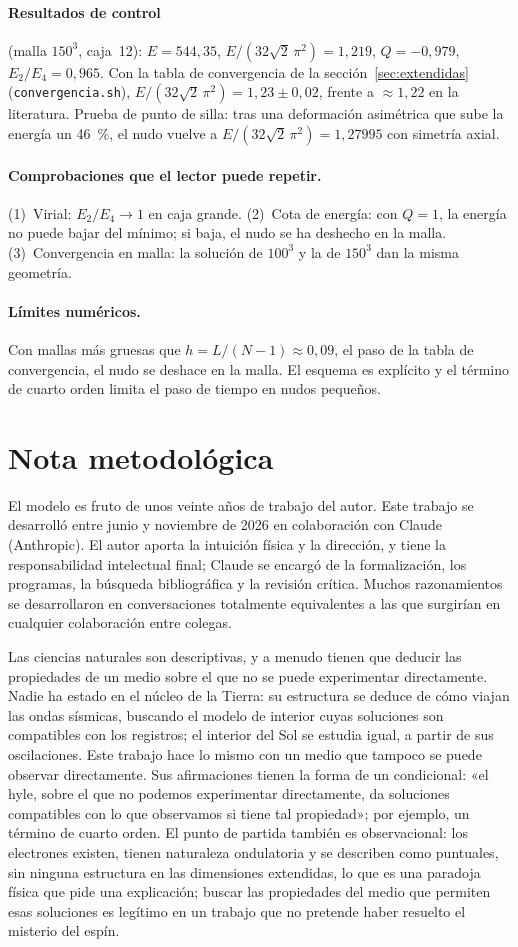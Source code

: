 \documentclass[11pt,a4paper]{article}
\newcommand{\prog}[1]{\texttt{#1}}
\newcommand{\apartado}[1]{\paragraph{#1}}
\begin{document}
\apartado{Resultados de control} (malla $150^3$, caja~12): $E=544,35$, $E/(32\sqrt2\,\pi^2)=1,219$, $Q=-0,979$, $E_2/E_4=0,965$. Con la tabla de convergencia de la sección~\ref{sec:extendidas} (\prog{convergencia.sh}), $E/(32\sqrt2\,\pi^2)=1,23\pm0,02$, frente a $\approx1,22$ en la literatura. Prueba de punto de silla: tras una deformación asimétrica que sube la energía un 46~\%, el nudo vuelve a $E/(32\sqrt2\,\pi^2)=1,27995$ con simetría axial.

\apartado{Comprobaciones que el lector puede repetir.} (1)~Virial: $E_2/E_4\to1$ en caja grande. (2)~Cota de energía: con $Q=1$, la energía no puede bajar del mínimo; si baja, el nudo se ha deshecho en la malla. (3)~Convergencia en malla: la solución de $100^3$ y la de $150^3$ dan la misma geometría.

\apartado{Límites numéricos.} Con mallas más gruesas que $h=L/(N-1)\approx0,09$, el paso de la tabla de convergencia, el nudo se deshace en la malla. El esquema es explícito y el término de cuarto orden limita el paso de tiempo en nudos pequeños.

\section*{Nota metodológica}

El modelo es fruto de unos veinte años de trabajo del autor. Este trabajo se desarrolló entre junio y noviembre de 2026 en colaboración con Claude (Anthropic). El autor aporta la intuición física y la dirección, y tiene la responsabilidad intelectual final; Claude se encargó de la formalización, los programas, la búsqueda bibliográfica y la revisión crítica. Muchos razonamientos se desarrollaron en conversaciones totalmente equivalentes a las que surgirían en cualquier colaboración entre colegas.

Las ciencias naturales son descriptivas, y a menudo tienen que deducir las propiedades de un medio sobre el que no se puede experimentar directamente. Nadie ha estado en el núcleo de la Tierra: su estructura se deduce de cómo viajan las ondas sísmicas, buscando el modelo de interior cuyas soluciones son compatibles con los registros; el interior del Sol se estudia igual, a partir de sus oscilaciones. Este trabajo hace lo mismo con un medio que tampoco se puede observar directamente. Sus afirmaciones tienen la forma de un condicional: «el hyle, sobre el que no podemos experimentar directamente, da soluciones compatibles con lo que observamos si tiene tal propiedad»; por ejemplo, un término de cuarto orden. El punto de partida también es observacional: los electrones existen, tienen naturaleza ondulatoria y se describen como puntuales, sin ninguna estructura en las dimensiones extendidas, lo que es una paradoja física que pide una explicación; buscar las propiedades del medio que permiten esas soluciones es legítimo en un trabajo que no pretende haber resuelto el misterio del espín.
\end{document}
